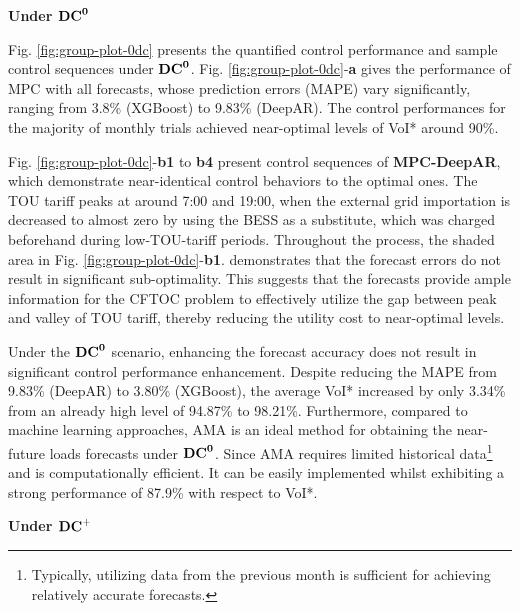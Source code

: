 \textbf{Under \texorpdfstring{$\mathbf{{DC}^{0}}$}{Lg}}

Fig. \ref{fig:group-plot-0dc} presents the quantified control performance and sample control sequences under $\mathbf{{DC}^{0}}$. Fig. \ref{fig:group-plot-0dc}-\textbf{a} gives the performance of MPC with all forecasts, whose prediction errors (MAPE) vary significantly, ranging from 3.8\% (XGBoost) to 9.83\% (DeepAR). The control performances for the majority of monthly trials achieved near-optimal levels of VoI* around 90\%.

Fig. \ref{fig:group-plot-0dc}-\textbf{b1} to \textbf{b4} present control sequences of \textbf{MPC-DeepAR}, which demonstrate near-identical control behaviors to the optimal ones. The TOU tariff peaks at around 7:00 and 19:00, when the external grid importation is decreased to almost zero by using the BESS as a substitute, which was charged beforehand during low-TOU-tariff periods. Throughout the process, the shaded area in Fig. \ref{fig:group-plot-0dc}-\textbf{b1}. demonstrates that the forecast errors do not result in significant sub-optimality. This suggests that the forecasts provide ample information for the CFTOC problem to effectively utilize the gap between peak and valley of TOU tariff, thereby reducing the utility cost to near-optimal levels.

Under the $\mathbf{{DC}^{0}}$ scenario, enhancing the forecast accuracy does not result in significant control performance enhancement. Despite reducing the MAPE from 9.83\% (DeepAR) to 3.80\% (XGBoost), the average VoI* increased by only 3.34\% from an already high level of 94.87\% to 98.21\%. 
Furthermore, compared to machine learning approaches, AMA is an ideal method for obtaining the near-future loads forecasts under $\mathbf{{DC}^{0}}$. Since AMA requires limited historical data\footnote{Typically, utilizing data from the previous month is sufficient for achieving relatively accurate forecasts.} and is computationally efficient. It can be easily implemented whilst exhibiting a strong performance of 87.9\% with respect to VoI*.


\textbf{Under \texorpdfstring{$\mathbf{{DC}^{+}}$}{Lg}}

